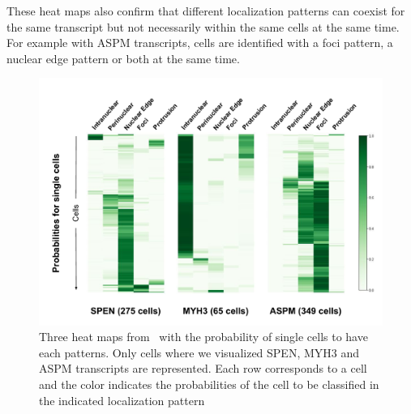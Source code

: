 These heat maps also confirm that different localization patterns can coexist for the same transcript but not necessarily within the same cells at the same time.
For example with ASPM transcripts, cells are identified with a foci pattern, a nuclear edge pattern or both at the same time.

\begin{figure}[h]
    \centering
    \includegraphics[width=\textwidth]{figures/appendix/heatmap_cell_racha}
    \caption{Three heat maps from~\cite{CHOUAIB_2020} with the probability of single cells to have each patterns.
	Only cells where we visualized SPEN, MYH3 and ASPM transcripts are represented.
	Each row corresponds to a cell and the color indicates the probabilities of the cell to be classified in the indicated localization pattern}
    \label{fig:heatmap_racha_cells}
\end{figure}
